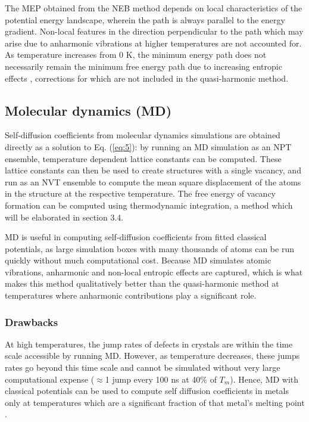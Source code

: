 \documentclass{article}
\begin{document}
The MEP obtained from the NEB method depends on local characteristics of the potential energy landscape, wherein the path is always parallel to the energy gradient. Non-local features in the direction perpendicular to the path which may arise due to anharmonic vibrations at higher temperatures are not accounted for. As temperature increases from $0$ K, the minimum energy path does not necessarily remain the minimum free energy path due to increasing entropic effects \cite{Vanden-Eijnden2009}, corrections for which are not included in the quasi-harmonic method.

\subsection{Molecular dynamics (MD)}

Self-diffusion coefficients from molecular dynamics simulations are obtained directly as a solution to Eq. (\ref{eq:5}): by running an MD simulation as an NPT ensemble, temperature dependent lattice constants can be computed. These lattice constants can then be used to create structures with a single vacancy, and run as an NVT ensemble to compute the mean square displacement of the atoms in the structure at the respective temperature. The free energy of vacancy formation can be computed using thermodynamic integration, a method which will be elaborated in section 3.4.

MD is useful in computing self-diffusion coefficients from fitted classical potentials, as large simulation boxes with many thousands of atoms can be run quickly without much computational cost. Because MD simulates atomic vibrations, anharmonic and non-local entropic effects are captured, which is what makes this method qualitatively better than the quasi-harmonic method at temperatures where anharmonic contributions play a significant role.

\subsubsection{Drawbacks}

\noindent At high temperatures, the jump rates of defects in crystals are within the time scale accessible by running MD. However, as temperature decreases, these jumps rates go beyond this time scale and cannot be simulated without very large computational expense ($\approx$1 jump every 100 ns at 40\% of $T_m$). Hence, MD with classical potentials can be used to compute self diffusion coefficients in metals only at temperatures which are a significant fraction of that metal's melting point \cite{Mendelev2009}. 
\end{document}
